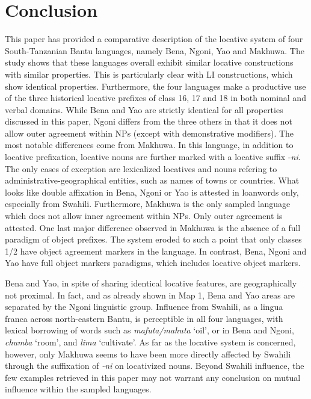 \documentclass[output=paper ]{langscibook}
\begin{document}
\section{Conclusion}\label{sec:mapunda:5} %

This paper has provided a comparative description of the locative system of four South-Tanzanian Bantu languages, namely Bena, Ngoni, Yao and Makhuwa. The study shows that these languages overall exhibit similar locative constructions with similar properties. This is particularly clear with LI constructions, which show identical properties. Furthermore, the four languages make a productive use of the three historical locative prefixes of class 16, 17 and 18 in both nominal and verbal domains. While Bena and Yao are strictly identical for all properties discussed in this paper, Ngoni differs from the three others in that it does not allow outer agreement within NPs (except with demonstrative modifiers). The most notable differences come from Makhuwa. In this language, in addition to locative prefixation, locative nouns are further marked with a locative suffix -\textit{ni}. The only cases of exception are lexicalized locatives and nouns refering to administrative-geographical entities, such as names of towns or countries. What looks like double affixation in Bena, Ngoni or Yao is attested in loanwords only, especially from Swahili. Furthermore, Makhuwa is the only sampled language which does not allow inner agreement within NPs. Only outer agreement is attested. One last major difference observed in Makhuwa is the absence of a full paradigm of object prefixes. The system eroded to such a point that only classes 1/2 have object agreement markers in the language. In contrast, Bena, Ngoni and Yao have full object markers paradigms, which includes locative object markers.

Bena and Yao, in spite of sharing identical locative features, are  geographically not proximal. In fact, and as already shown in Map 1, Bena and Yao areas are separated by the Ngoni linguistic group. Influence from Swahili, as a lingua franca across north-eastern Bantu, is perceptible in all four languages, with lexical borrowing of words such as \textit{mafuta/mahuta} ‘oil’, or in Bena and Ngoni, \textit{chumba} ‘room’, and \textit{lima} ‘cultivate’. As far as the locative system is concerned, however, only Makhuwa seems to have been more directly affected by Swahili through the suffixation of \textit{{}-ni} on locativized nouns. Beyond Swahili influence, the few examples retrieved in this paper may not warrant any conclusion on mutual influence within the sampled languages.
\end{document}
